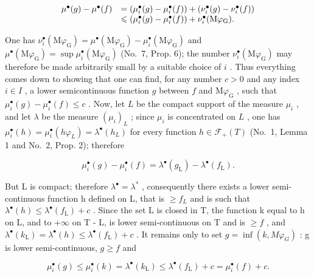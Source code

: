 \[
\begin{array}{r l} \mu^ {\bullet} (g) - \mu^ {\bullet} (f) & = (\mu_ {i} ^ {\bullet} (g) - \mu_ {i} ^ {\bullet} (f)) + (\nu_ {i} ^ {\bullet} (g) - \nu_ {i} ^ {\bullet} (f)) \\ & \leqslant (\mu_ {i} ^ {\bullet} (g) - \mu_ {i} ^ {\bullet} (f)) + \nu_ {i} ^ {\bullet} (\mathrm{M} \varphi_ {\mathrm{G}}). \end{array}
\]

One has \(\nu_{i}^{\bullet}(\mathrm{M}\varphi_{\mathrm{G}}) = \mu^{\bullet}(\mathrm{M}\varphi_{\mathrm{G}}) - \mu_{i}^{\bullet}(\mathrm{M}\varphi_{\mathrm{G}})\) and \(\mu^{\bullet}(\mathrm{M}\varphi_{\mathrm{G}}) = \sup \mu_{i}^{\bullet}(\mathrm{M}\varphi_{\mathrm{G}})\) (No.~7, Prop. 6); the number \(\nu_{i}^{\bullet}(\mathrm{M}\varphi_{\mathrm{G}})\) may therefore be made arbitrarily small by a suitable choice of \(i\) . Thus everything comes down to showing that one can find, for any number \(c > 0\) and any index \(i \in I\) , a lower semicontinuous function \(g\) between \(f\) and \(\mathrm{M}\varphi_{\mathrm{G}}\) , such that \(\mu_{i}^{\bullet}(g) - \mu_{i}^{\bullet}(f) \leqslant c\) . Now, let \(L\) be the compact support of the measure \(\mu_{i}\) , and let \(\lambda\) be the measure \((\mu_{i})_{L}\) ; since \(\mu_{i}\) is concentrated on \(L\) , one has \(\mu_{i}^{\bullet}(h) = \mu_{i}^{\bullet}(h\varphi_{L}) = \lambda^{\bullet}(h_{L})\) for every function \(h \in \mathcal{F}_{+}(T)\) (No.~1, Lemma 1 and No.~2, Prop. 2); therefore

\[
\mu_ {i} ^ {\bullet} (g) - \mu_ {i} ^ {\bullet} (f) = \lambda^ {\bullet} (g _ {\mathrm{L}}) - \lambda^ {\bullet} (f _ {\mathrm{L}}).
\]

But L is compact; therefore \(\lambda^{\bullet} = \lambda^{*}\) , consequently there exists a lower semi-continuous function h defined on L, that is \(\geqslant f_{L}\) and is such that \(\lambda^{\bullet}(h) \leqslant \lambda^{\bullet}(f_{\mathrm{L}}) + c\) . Since the set L is closed in T, the function k equal to h on L, and to \(+\infty\) on T - L, is lower semi-continuous on T and is \(\geqslant f\) , and \(\lambda^{\bullet}(k_{\mathrm{L}}) = \lambda^{\bullet}(h) \leqslant \lambda^{\bullet}(f_{\mathrm{L}}) + c\) . It remains only to set \(g = \inf(k, M\varphi_{G})\) : g is lower semi-continuous, \(g \geqslant f\) and

\[
\mu_ {i} ^ {\bullet} (g) \leqslant \mu_ {i} ^ {\bullet} (k) = \lambda^ {\bullet} (k _ {\mathrm{L}}) \leqslant \lambda^ {\bullet} (f _ {\mathrm{L}}) + c = \mu_ {i} ^ {\bullet} (f) + c.
\]

